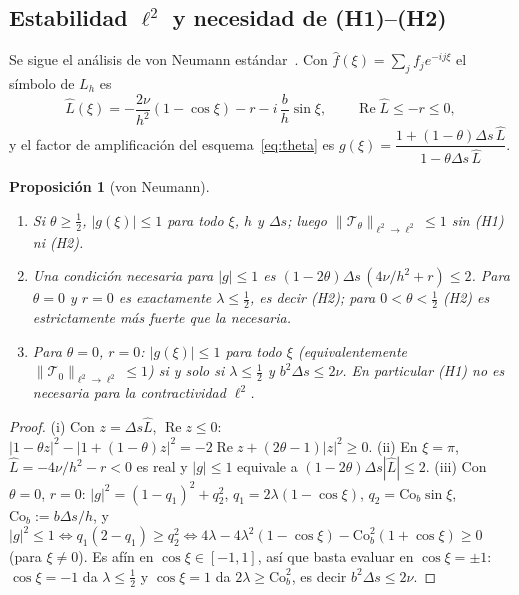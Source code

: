 \documentclass[11pt,letterpaper]{article}
\theoremstyle{plain}
\newtheorem{proposicion}[theorem]{Proposición}
\theoremstyle{definition}
\theoremstyle{remark}
\numberwithin{equation}{section}
\newcommand{\norm}[1]{\lVert #1\rVert}
\newcommand{\Top}{\mathcal{T}}
\begin{document}
	\subsection{Estabilidad \texorpdfstring{\(\ell^2\)}{ℓ2} y necesidad de (H1)--(H2)}\label{subsec:vn}
	
	Se sigue el análisis de von Neumann estándar~\cite{Strikwerda2004,LeVeque2007}. Con \(\hat f(\xi)=\sum_jf_je^{-ij\xi}\) el símbolo de \(L_h\) es
	\[
	\hat L(\xi)=-\frac{2\nu}{h^2}(1-\cos\xi)-r-i\,\frac bh\sin\xi,\qquad\operatorname{Re}\hat L\le-r\le0,
	\]
	y el factor de amplificación del esquema~\eqref{eq:theta} es \(g(\xi)=\dfrac{1+(1-\theta)\Delta s\,\hat L}{1-\theta\Delta s\,\hat L}\).
	
	\begin{proposicion}[von Neumann]\label{prop:vn}
		\begin{enumerate}[label=(\roman*)]
			\item Si \(\theta\ge\frac12\), \(|g(\xi)|\le1\) para todo \(\xi\), \(h\) y \(\Delta s\); luego \(\|\Top_\theta\|_{\ell^2\to\ell^2}\le1\) sin (H1) ni (H2).
			\item Una condición necesaria para \(|g|\le1\) es \((1-2\theta)\Delta s\,(4\nu/h^2+r)\le2\). Para \(\theta=0\) y \(r=0\) es exactamente \(\lambda\le\frac12\), es decir (H2); para \(0<\theta<\frac12\) (H2) es estrictamente más fuerte que la necesaria.
			\item Para \(\theta=0\), \(r=0\): \(|g(\xi)|\le1\) para todo \(\xi\) (equivalentemente \(\norm{\Top_0}_{\ell^2\to\ell^2}\le1\)) si y solo si \(\lambda\le\frac12\) y \(b^2\Delta s\le2\nu\). En particular (H1) no es necesaria para la contractividad \(\ell^2\).
		\end{enumerate}
	\end{proposicion}
	
	\begin{proof}
		(i) Con \(z=\Delta s\hat L\), \(\operatorname{Re}z\le0\): \(|1-\theta z|^2-|1+(1-\theta)z|^2=-2\operatorname{Re}z+(2\theta-1)|z|^2\ge0\). (ii) En \(\xi=\pi\), \(\hat L=-4\nu/h^2-r<0\) es real y \(|g|\le1\) equivale a \((1-2\theta)\Delta s|\hat L|\le2\). (iii) Con \(\theta=0\), \(r=0\): \(|g|^2=(1-q_1)^2+q_2^2\), \(q_1=2\lambda(1-\cos\xi)\), \(q_2=\mathrm{Co}_b\sin\xi\), \(\mathrm{Co}_b:=b\Delta s/h\), y \(|g|^2\le1\iff q_1(2-q_1)\ge q_2^2\iff4\lambda-4\lambda^2(1-\cos\xi)-\mathrm{Co}_b^2(1+\cos\xi)\ge0\) (para \(\xi\ne0\)). Es afín en \(\cos\xi\in[-1,1]\), así que basta evaluar en \(\cos\xi=\pm1\): \(\cos\xi=-1\) da \(\lambda\le\frac12\) y \(\cos\xi=1\) da \(2\lambda\ge\mathrm{Co}_b^2\), es decir \(b^2\Delta s\le2\nu\).
	\end{proof}
	
\end{document}

